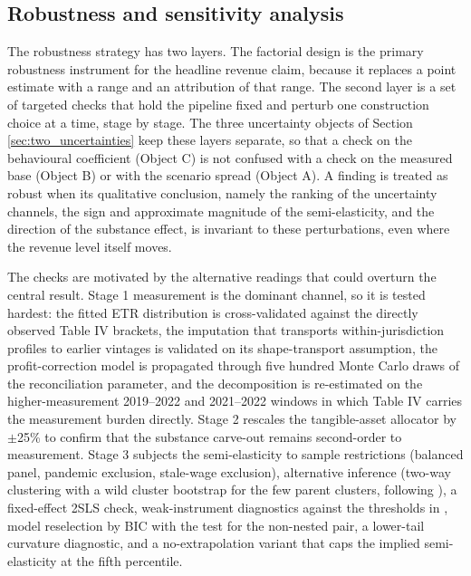 \documentclass[11pt,a4paper]{article}
\begin{document}
\subsection{Robustness and sensitivity analysis}\label{sec:robustness_method}

The robustness strategy has two layers. The factorial design is the primary robustness instrument for the headline revenue claim, because it replaces a point estimate with a range and an attribution of that range. The second layer is a set of targeted checks that hold the pipeline fixed and perturb one construction choice at a time, stage by stage. The three uncertainty objects of Section \ref{sec:two_uncertainties} keep these layers separate, so that a check on the behavioural coefficient (Object C) is not confused with a check on the measured base (Object B) or with the scenario spread (Object A). A finding is treated as robust when its qualitative conclusion, namely the ranking of the uncertainty channels, the sign and approximate magnitude of the semi-elasticity, and the direction of the substance effect, is invariant to these perturbations, even where the revenue level itself moves.

The checks are motivated by the alternative readings that could overturn the central result. Stage 1 measurement is the dominant channel, so it is tested hardest: the fitted ETR distribution is cross-validated against the directly observed Table IV brackets, the imputation that transports within-jurisdiction profiles to earlier vintages is validated on its shape-transport assumption, the profit-correction model is propagated through five hundred Monte Carlo draws of the reconciliation parameter, and the decomposition is re-estimated on the higher-measurement 2019--2022 and 2021--2022 windows in which Table IV carries the measurement burden directly. Stage 2 rescales the tangible-asset allocator by $\pm$25\% to confirm that the substance carve-out remains second-order to measurement. Stage 3 subjects the semi-elasticity to sample restrictions (balanced panel, pandemic exclusion, stale-wage exclusion), alternative inference (two-way clustering with a wild cluster bootstrap for the few parent clusters, following \citealt{cameron2008}), a fixed-effect 2SLS check, weak-instrument diagnostics against the thresholds in \citet{stock2005}, model reselection by BIC \citep{raftery1995} with the \citet{vuong1989} test for the non-nested pair, a lower-tail curvature diagnostic, and a no-extrapolation variant that caps the implied semi-elasticity at the fifth percentile.
\end{document}
